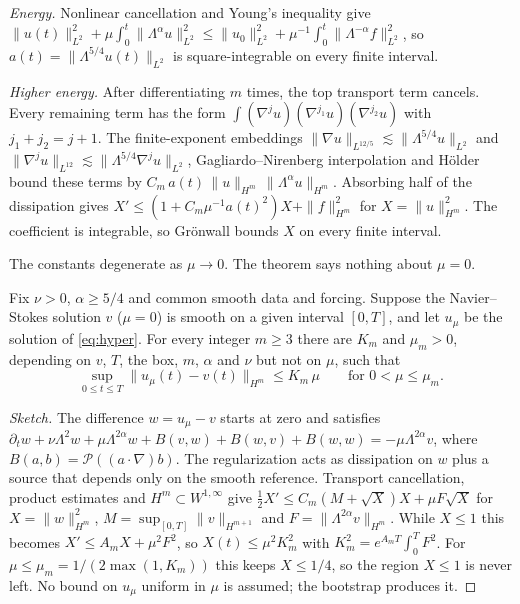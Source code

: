 \noindent\emph{Energy.} Nonlinear cancellation and Young's inequality give
$\|u(t)\|_{L^2}^2+\mu\int_0^t\|\Lambda^\alpha u\|_{L^2}^2\le\|u_0\|_{L^2}^2+\mu^{-1}\int_0^t\|\Lambda^{-\alpha}f\|_{L^2}^2$,
so $a(t)=\|\Lambda^{5/4}u(t)\|_{L^2}$ is square-integrable on every finite interval.

\noindent\emph{Higher energy.} After differentiating $m$ times, the top transport term cancels. Every
remaining term has the form $\int(\nabla^ju)(\nabla^{j_1}u)(\nabla^{j_2}u)$ with $j_1+j_2=j+1$.
The finite-exponent embeddings $\|\nabla u\|_{L^{12/5}}\lesssim\|\Lambda^{5/4}u\|_{L^2}$ and
$\|\nabla^ju\|_{L^{12}}\lesssim\|\Lambda^{5/4}\nabla^ju\|_{L^2}$, Gagliardo--Nirenberg interpolation and
H\"older bound these terms by $C_m\,a(t)\,\|u\|_{H^m}\,\|\Lambda^\alpha u\|_{H^m}$. Absorbing half of
the dissipation gives
$X'\le(1+C_m\mu^{-1}a(t)^2)X+\|f\|_{H^m}^2$ for $X=\|u\|_{H^m}^2$. The coefficient is integrable,
so Gr\"onwall bounds $X$ on every finite interval.

\noindent The constants degenerate as $\mu\to0$. The theorem says nothing about $\mu=0$.

\begin{theorem}\label{thm:recovery}
Fix $\nu>0$, $\alpha\ge5/4$ and common smooth data and forcing. Suppose the Navier--Stokes solution
$v$ ($\mu=0$) is smooth on a given interval $[0,T]$, and let $u_\mu$ be the solution of \eqref{eq:hyper}.
For every integer $m\ge3$ there are $K_m$ and $\mu_m>0$, depending on $v$, $T$, the box, $m$,
$\alpha$ and $\nu$ but not on $\mu$, such that
\[
\sup_{0\le t\le T}\|u_\mu(t)-v(t)\|_{H^m}\le K_m\,\mu\qquad\text{for }0<\mu\le\mu_m .
\]
\end{theorem}

\begin{proof}[Sketch]
The difference $w=u_\mu-v$ starts at zero and satisfies
$\partial_tw+\nu\Lambda^2w+\mu\Lambda^{2\alpha}w+B(v,w)+B(w,v)+B(w,w)=-\mu\Lambda^{2\alpha}v$, where
$B(a,b)=\mathcal P((a\cdot\nabla)b)$. The regularization acts as dissipation on $w$ plus a source
that depends only on the smooth reference. Transport cancellation, product estimates and
$H^m\subset W^{1,\infty}$ give
$\tfrac12X'\le C_m(M+\sqrt X)X+\mu F\sqrt X$ for $X=\|w\|_{H^m}^2$, $M=\sup_{[0,T]}\|v\|_{H^{m+1}}$ and
$F=\|\Lambda^{2\alpha}v\|_{H^m}$. While $X\le1$ this becomes $X'\le A_mX+\mu^2F^2$, so
$X(t)\le\mu^2K_m^2$ with $K_m^2=e^{A_mT}\int_0^TF^2$. For $\mu\le\mu_m=1/(2\max(1,K_m))$ this keeps
$X\le1/4$, so the region $X\le1$ is never left. No bound on $u_\mu$ uniform in $\mu$ is assumed; the
bootstrap produces it.
\end{proof}

